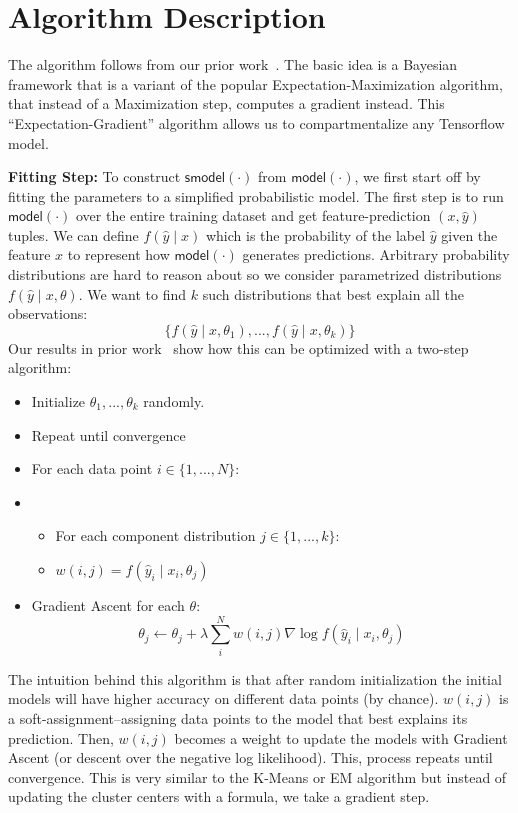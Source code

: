 \section{Algorithm Description}
The algorithm follows from our prior work~\cite{DBLP:journals/corr/KrishnanGLMPG16, Krishnan17}.  The basic idea is a Bayesian framework that is a variant of the popular Expectation-Maximization algorithm, that instead of a Maximization step, computes a gradient instead. This ``Expectation-Gradient'' algorithm allows us to compartmentalize any Tensorflow model.

\vspace{0.5em} \noindent \textbf{Fitting Step: } To construct $\textsf{smodel}(\cdot)$ from $\textsf{model}(\cdot)$, we first start off by fitting the parameters to a simplified probabilistic model. 
The first step is to run $\textsf{model}(\cdot)$ over the entire training dataset and get feature-prediction $(x, \hat{y})$ tuples.
We can define $f(\hat{y} \mid x)$ which is the probability of the label $\hat{y}$ given the feature $x$ to represent how $\textsf{model}(\cdot)$ generates predictions. 
Arbitrary probability distributions are hard to reason about so we consider parametrized distributions $f(\hat{y} \mid x, \theta)$. 
We want to find $k$ such distributions that best explain all the observations:
\[
\{f(\hat{y} \mid x, \theta_1),...,f(\hat{y} \mid x, \theta_k)\}
\]
Our results in prior work~\cite{?,Krishnan17} show how this can be optimized with a two-step algorithm:
\begin{itemize}
    \item Initialize $\theta_1,...,\theta_k$ randomly.
    \item Repeat until convergence
    \item For each data point $i \in \{1,...,N\}$: 
    \item \begin{itemize} 
          \item For each component distribution $j \in \{1,...,k\}$:
          \item $w(i,j) = f(\hat{y}_i \mid x_i, \theta_j)$
    \end{itemize}
    \item Gradient Ascent for each $\theta$:
    \[ \theta_j \leftarrow \theta_j + \lambda \sum_i^N w(i,j) \nabla \log f(\hat{y}_i \mid x_i, \theta_j)  \]
\end{itemize}

The intuition behind this algorithm is that after random initialization the initial models will have higher accuracy on different data points (by chance). $w(i,j)$ is a soft-assignment--assigning data points to the model that best explains its prediction. Then, $w(i,j)$ becomes a weight to update the models with Gradient Ascent (or descent over the negative log likelihood). This, process repeats until convergence. This is very similar to the K-Means or EM algorithm but instead of updating the cluster centers with a formula, we take a gradient step.

